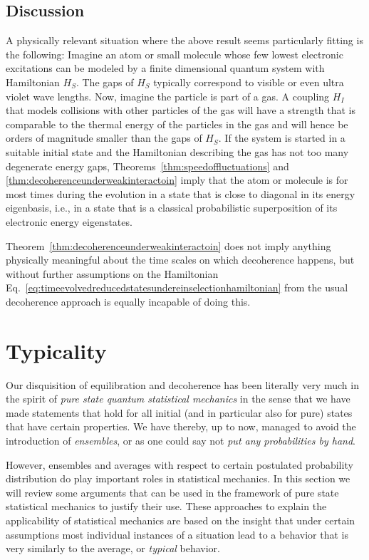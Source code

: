 \documentclass[a4paper,12pt,listof=totoc,index=totoc,bibliography=totoc,headsepline=false,headings=normal,BCOR16.153846mm,DIV12,headinclude,twoside,cleardoublepage=empty,numbers=noenddot,final]{scrreprt}
\theoremstyle{mystyle}
\numberwithin{equation}{section}
\numberwithin{figure}{section}
\numberwithin{lemma}{section}
\numberwithin{theorem}{section}
\numberwithin{corollary}{section}
\numberwithin{definition}{section}
\numberwithin{conjecture}{section}
\numberwithin{observation}{section}
\newcommand{\+}{\mkern2mu}
\newcommand{\texteqref}[1]{Eq.~\eqref{#1}}
\renewcommand{\H}{H}
\DeclareMathOperator{\1}{\mathds{1}}
\begin{document}
\subsection*{Discussion}
%
A physically relevant situation where the above result seems particularly fitting is the following:
Imagine an atom or small molecule whose few lowest electronic excitations can be modeled by a finite dimensional quantum system with Hamiltonian $\H_S$.
The gaps of $\H_S$ typically correspond to visible or even ultra violet wave lengths.
Now, imagine the particle is part of a gas.
A coupling $\H_I$ that models collisions with other particles of the gas will have a strength that is comparable to the thermal energy of the particles in the gas and will hence be orders of magnitude smaller than the gaps of $\H_S$.
If the system is started in a suitable initial state and the Hamiltonian describing the gas has not too many degenerate energy gaps, Theorems~\ref{thm:speedoffluctuations} and \ref{thm:decoherenceunderweakinteractoin} imply that the atom or molecule is for most times during the evolution in a state that is close to diagonal in its energy eigenbasis, i.e., in a state that is a classical probabilistic superposition of its electronic energy eigenstates.

Theorem~\ref{thm:decoherenceunderweakinteractoin} does not imply anything physically meaningful about the time scales on which decoherence happens, but without further assumptions on the Hamiltonian \texteqref{eq:timeevolvedreducedstatesundereinselectionhamiltonian} from the usual decoherence approach is equally incapable of doing this.


\section{Typicality}
\label{sec:typicality}
%
Our disquisition of equilibration and decoherence has been literally very much in the spirit of \emph{pure state quantum statistical mechanics} in the sense that we have made statements that hold for all initial (and in particular also for pure) states that have certain properties.
We have thereby, up to now, managed to avoid the introduction of \emph{ensembles}, or as one could say not \emph{put any probabilities by hand}.

However, ensembles and averages with respect to certain postulated probability distribution do play important roles in statistical mechanics.
In this section we will review some arguments that can be used in the framework of pure state statistical mechanics to justify their use.
These approaches to explain the applicability of statistical mechanics are based on the insight that under certain assumptions most individual instances of a situation lead to a behavior that is very similarly to the average, or \emph{typical} behavior.
\end{document}
